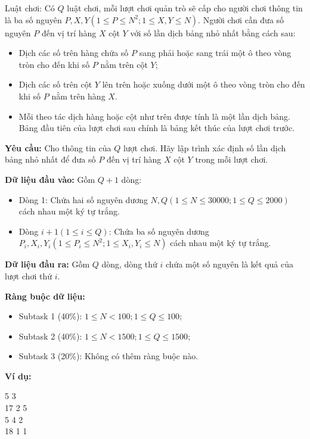 \documentclass[12pt]{scrartcl}  %
\begin{document}
Luật chơi: Có $Q$ luật chơi, mỗi lượt chơi quản trò sẽ cấp cho người chơi thông tin là ba số nguyên $P, X, Y ( 1 \leq P \leq N^2; 1 \leq X, Y \leq N)$. Người chơi 
cần đưa số nguyên $P$ đến vị trí hàng $X$ cột $Y$ với số lần dịch bảng nhỏ nhất bằng cách sau:
\begin{itemize}
    \item Dịch các số trên hàng chứa số $P$ sang phải hoặc sang trái một ô theo vòng tròn cho đến khi số $P$ nằm trên cột $Y$;
    \item Dịch các số trên cột $Y$ lên trên hoặc xuống dưới một ô theo vòng tròn cho đến khi số $P$ nằm trên hàng $X$.
    \item Mỗi theo tác dịch hàng hoặc cột như trên được tính là một lần dịch bảng. Bảng đầu tiên của lượt chơi sau chính là bảng kết thúc của lượt chơi trước.
\end{itemize}

\textbf{Yêu cầu:}
Cho thông tin của $Q$ lượt chơi. Hãy lập trình xác định số lần dịch bảng nhỏ nhất để đưa số $P$ đến vị trí hàng $X$ cột $Y$ trong mỗi lượt chơi.

\textbf{Dữ liệu đầu vào:}
Gồm $Q + 1$ dòng:
\begin{itemize}
    \item Dòng 1: Chứa hai số nguyên dương $N, Q (1 \leq N \leq 30000; 1 \leq Q \leq 2000)$ cách nhau một ký tự trắng.
    \item Dòng $i + 1 (1 \leq i \leq Q)$: Chứa ba số nguyên dương $P_i, X_i, Y_i (1 \leq P_i \leq N^2; 1 \leq X_i, Y_i \leq N)$ cách nhau một ký tự trắng.
\end{itemize}

\textbf{Dữ liệu đầu ra:}
Gồm $Q$ dòng, dòng thứ $i$ chứa một số nguyên là kết quả của lượt chơi thứ $i$.

\textbf{Ràng buộc dữ liệu:}
\begin{itemize}
    \item Subtask 1 (40\%): $1 \leq N < 100; 1 \leq Q \leq 100$;
    \item Subtask 2 (40\%): $1 \leq N < 1500; 1 \leq Q \leq 1500$;
    \item Subtask 3 (20\%): Không có thêm ràng buộc nào.
\end{itemize}

\textbf{Ví dụ:}
\begin{tcolorbox}[colback=gray!5!white, colframe=blue!50!black, title=Input]
5 3\\
17 2 5\\
5 4 2\\
18 1 1
\end{tcolorbox}
\end{document}
